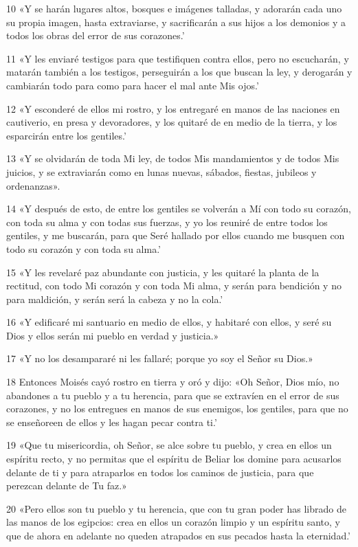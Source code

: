 \par 10 «Y se harán lugares altos, bosques e imágenes talladas, y adorarán cada uno su propia imagen, hasta extraviarse, y sacrificarán a sus hijos a los demonios y a todos los obras del error de sus corazones.'
\par 11 «Y les enviaré testigos para que testifiquen contra ellos, pero no escucharán, y matarán también a los testigos, perseguirán a los que buscan la ley, y derogarán y cambiarán todo para como para hacer el mal ante Mis ojos.'
\par 12 «Y esconderé de ellos mi rostro, y los entregaré en manos de las naciones en cautiverio, en presa y devoradores, y los quitaré de en medio de la tierra, y los esparcirán entre los gentiles.'
\par 13 «Y se olvidarán de toda Mi ley, de todos Mis mandamientos y de todos Mis juicios, y se extraviarán como en lunas nuevas, sábados, fiestas, jubileos y ordenanzas».
\par 14 «Y después de esto, de entre los gentiles se volverán a Mí con todo su corazón, con toda su alma y con todas sus fuerzas, y yo los reuniré de entre todos los gentiles, y me buscarán, para que Seré hallado por ellos cuando me busquen con todo su corazón y con toda su alma.'
\par 15 «Y les revelaré paz abundante con justicia, y les quitaré la planta de la rectitud, con todo Mi corazón y con toda Mi alma, y ​​serán para bendición y no para maldición, y serán será la cabeza y no la cola.'
\par 16 «Y edificaré mi santuario en medio de ellos, y habitaré con ellos, y seré su Dios y ellos serán mi pueblo en verdad y justicia.»
\par 17 «Y no los desampararé ni les fallaré; porque yo soy el Señor su Dios.»
\par 18 Entonces Moisés cayó rostro en tierra y oró y dijo: «Oh Señor, Dios mío, no abandones a tu pueblo y a tu herencia, para que se extravíen en el error de sus corazones, y no los entregues en manos de sus enemigos, los gentiles, para que no se enseñoreen de ellos y les hagan pecar contra ti.'
\par 19 «Que tu misericordia, oh Señor, se alce sobre tu pueblo, y crea en ellos un espíritu recto, y no permitas que el espíritu de Beliar los domine para acusarlos delante de ti y para atraparlos en todos los caminos de justicia, para que perezcan delante de Tu faz.»
\par 20 «Pero ellos son tu pueblo y tu herencia, que con tu gran poder has librado de las manos de los egipcios: crea en ellos un corazón limpio y un espíritu santo, y que de ahora en adelante no queden atrapados en sus pecados hasta la eternidad.'
